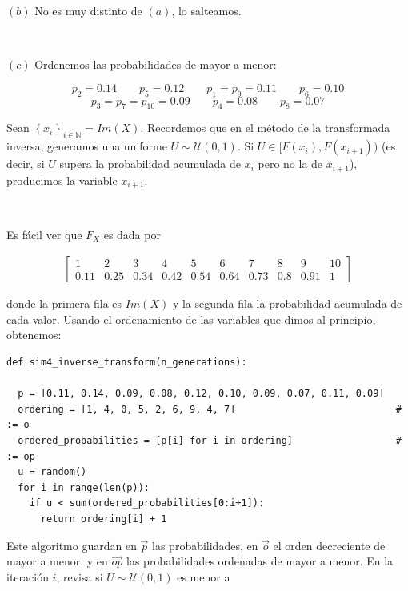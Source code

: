 \documentclass[a4paper, 12pt]{article}
\begin{document}
$(b)$ No es muy distinto de $(a)$, lo salteamos. 

~

$(c)$ Ordenemos las probabilidades de mayor a menor: 

\begin{equation*}
  p_2 = 0.14 \qquad p_5 = 0.12 \qquad p_1 = p_9 = 0.11 \qquad p_6 = 0.10 
\end{equation*}
\begin{equation*}
  p_3 = p_7 = p_{10} = 0.09 \qquad p_4 = 0.08 \qquad p_8 = 0.07
\end{equation*}

Sean $\left\{ x_i \right\}_{i \in \mathbb{N}} = Im(X) $. Recordemos que en el
método de la transformada inversa, generamos una uniforme $U \sim \mathcal{U}(0,
1)$. Si $U \in [F(x_i), F(x_{i+1}))$ (es decir, si $U$ supera la probabilidad
acumulada de $x_i$ pero no la de $x_{i+1}$), producimos la variable $x_{i+1}$.

~ 

Es fácil ver que $F_X$ es dada por


\begin{align*}
  \begin{bmatrix} 
     1 & 2 & 3 & 4 & 5 & 6 & 7 & 8 &9 & 10\\ 
     0.11 & 0.25 & 0.34 & 0.42 & 0.54 & 0.64 & 0.73 & 0.8 & 0.91 & 1
  \end{bmatrix} 
\end{align*}

donde la primera fila es $Im(X)$ y la segunda fila la probabilidad acumulada de
cada valor. Usando el ordenamiento de las variables que dimos al principio,
obtenemos:

\begin{verbatim}
def sim4_inverse_transform(n_generations):

  p = [0.11, 0.14, 0.09, 0.08, 0.12, 0.10, 0.09, 0.07, 0.11, 0.09]
  ordering = [1, 4, 0, 5, 2, 6, 9, 4, 7]                            # := o
  ordered_probabilities = [p[i] for i in ordering]                  # := op
  u = random()
  for i in range(len(p)):
    if u < sum(ordered_probabilities[0:i+1]):
      return ordering[i] + 1

\end{verbatim}

Este algoritmo guardan en $\overrightarrow{p}$ las probabilidades, en
$\overrightarrow{o}$ el orden decreciente de mayor a menor, y en
$\overrightarrow{op}$ las probabilidades ordenadas de mayor a menor. En la
iteración $i$, revisa si $U \sim \mathcal{U}(0, 1)$ es menor a 
\end{document}
